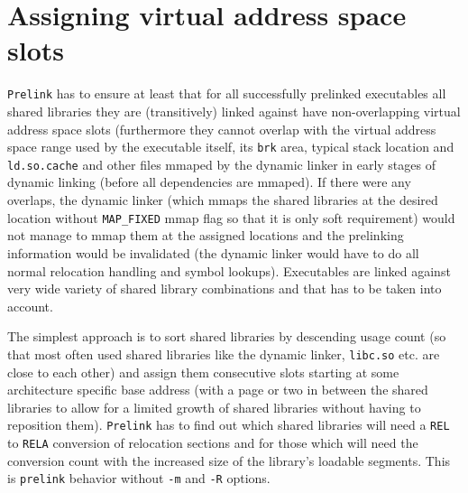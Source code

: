 \documentclass[twoside]{article}
\def\tts#1{\texttt{\small #1}}
\begin{document}
\section{Assigning virtual address space slots}

\tts{Prelink} has to ensure at least that for all successfully prelinked
executables all shared libraries they are (transitively) linked against
have non-overlapping virtual address space slots (furthermore they
cannot overlap with the virtual address space range used by the executable
itself, its \tts{brk} area, typical stack location and \tts{ld.so.cache}
and other files mmaped by the dynamic linker in early stages of dynamic
linking (before all dependencies are mmaped).  If there were any overlaps,
the dynamic linker (which mmaps the shared libraries at the desired location
without \tts{MAP\_FIXED} mmap flag so that it is only soft requirement) would
not manage to mmap them at the assigned locations and the prelinking
information would be invalidated (the dynamic linker would have to do all
normal relocation handling and symbol lookups).  Executables are linked against
very wide variety of shared library combinations and that has to be taken
into account.

The simplest approach is to sort shared libraries by descending
usage count (so that most often used shared libraries like the dynamic
linker, \tts{libc.so} etc. are close to each other) and assign them
consecutive slots starting at some architecture specific base address
(with a page or two in between the shared libraries to allow for a limited
growth of shared libraries without having to reposition them).
\tts{Prelink} has to find out which shared libraries will need
a \tts{REL} to \tts{RELA} conversion of relocation sections
and for those which will need the conversion count with the increased size
of the library's loadable segments.  This is \tts{prelink} behavior without
\tts{-m} and \tts{-R} options.
\end{document}
